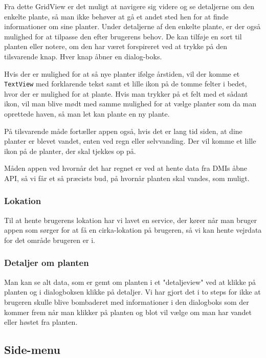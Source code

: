 Fra dette GridView er det muligt at navigere sig videre og se detaljerne om den enkelte plante, så man ikke behøver at gå et andet sted hen for at finde informationer om sine planter. Under detaljerne af den enkelte plante, er der også mulighed for at tilpasse den efter brugerens behov. De kan tilføje en sort til planten eller notere, om den har været forspireret ved at trykke på den tilsvarende knap. Hver knap åbner en dialog-boks.

Hvis der er mulighed for at så nye planter ifølge årstiden, vil der komme et \texttt{TextView} med forklarende tekst samt et lille ikon på de tomme felter i bedet, hvor der er mulighed for at plante. Hvis man trykker på et felt med et sådant ikon, vil man blive mødt med samme mulighed for at vælge planter som da man oprettede haven, så man let kan plante en ny plante.

På tilsvarende måde fortæller appen også, hvis det er lang tid siden, at dine planter er blevet vandet, enten ved regn eller selvvanding. Der vil komme et lille ikon på de planter, der skal tjekkes op på.

Måden appen ved hvornår det har regnet er ved at hente data fra DMIs åbne API, så vi får et så præcists bud, på hvornår planten skal vandes, som muligt.

\subsubsection{Lokation}

Til at hente brugerens lokation har vi lavet en service, der kører når man bruger appen som sørger for at få en cirka-lokation på brugeren, så vi kan hente vejrdata for det område brugeren er i.

\subsubsection{Detaljer om planten}

Man kan se alt data, som er gemt om planten i et "detaljeview" ved at klikke på planten og i dialogboksen klikke på detaljer. Vi har gjort det i to steps for ikke at brugeren skulle blive bombaderet med informationer i den dialogboks som der kommer frem når man klikker på planten og blot vil vælge om man har vandet eller høstet fra planten.

\subsection{Side-menu}

